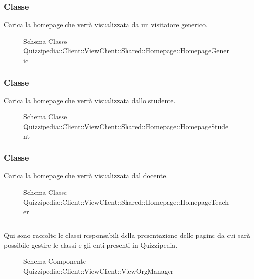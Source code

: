 \subsubsection{Classe }
Carica la homepage che verrà visualizzata da un visitatore generico.
\begin{figure}[H]
\centering
\noindent{}
\caption[Schema Classe HomepageGeneric]{Schema Classe Quizzipedia::Client::ViewClient::Shared::Homepage::HomepageGeneric}
\end{figure}
\subsubsection{Classe }
Carica la homepage che verrà visualizzata dallo studente.
\begin{figure}[H]
\centering
\noindent{}
\caption[Schema Classe HomepageStudent]{Schema Classe Quizzipedia::Client::ViewClient::Shared::Homepage::HomepageStudent}
\end{figure}
\subsubsection{Classe }
Carica la homepage che verrà visualizzata dal docente.
\begin{figure}[H]
\centering
\noindent{}
\caption[Schema Classe HomepageTeacher]{Schema Classe Quizzipedia::Client::ViewClient::Shared::Homepage::HomepageTeacher}
\end{figure}
\subsection{}
Qui sono raccolte le classi responsabili della presentazione delle pagine da cui sarà possibile gestire le classi e gli enti presenti in Quizzipedia.
\begin{figure}[H]
\centering
\noindent{}
\caption[Schema Componente Quizzipedia::Client::ViewClient::ViewOrgManager]{Schema Componente Quizzipedia::Client::ViewClient::ViewOrgManager}
\end{figure}

